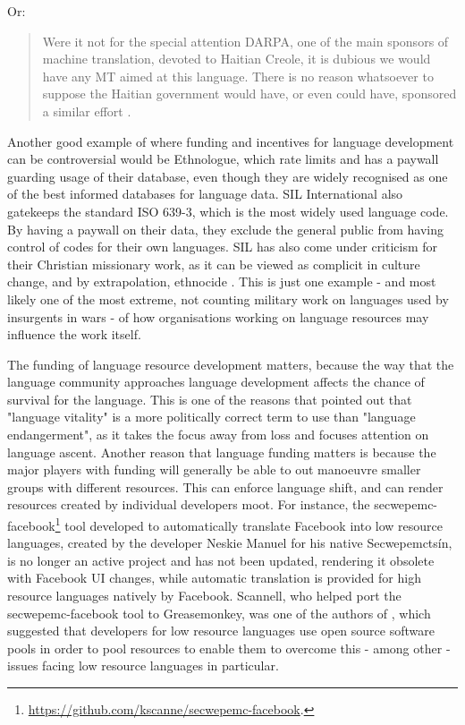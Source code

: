 Or:

\begin{quote}
Were it not for the special attention DARPA, one of the main sponsors of machine translation, devoted to Haitian Creole, it is dubious we would have any MT aimed at this language. There is no reason whatsoever to suppose the Haitian government would have, or even could have, sponsored a similar effort \citep{spice}. \citep[9]{kornai2013digital}
\end{quote}

Another good example of where funding and incentives for language development can be controversial would be Ethnologue, which rate limits and has a paywall guarding usage of their database, even though they are widely recognised as one of the best informed databases for language data. SIL International also gatekeeps the standard ISO 639-3, which is the most widely used language code. By having a paywall on their data, they exclude the general public from having control of codes for their own languages. SIL has also come under criticism for their Christian missionary work, as it can be viewed as complicit in culture change, and by extrapolation, ethnocide \citep{dobrin2009sil, dobrin2009practical, everett2009don}. This is just one example - and most likely one of the most extreme, not counting military work on languages used by insurgents in wars - of how organisations working on language resources may influence the work itself.

The funding of language resource development matters, because the way that the language community approaches language development affects the chance of survival for the language. This is one of the reasons that \citet{grenoble2016response} pointed out that "language vitality" is a more politically correct term to use than "language endangerment", as it takes the focus away from loss and focuses attention on language ascent. Another reason that language funding matters is because the major players with funding will generally be able to out manoeuvre smaller groups with different resources. This can enforce language shift, and can render resources created by individual developers moot. For instance, the secwepemc-facebook\footnote{\href{https://github.com/kscanne/secwepemc-facebook}{https://github.com/kscanne/secwepemc-facebook}. } tool developed to automatically translate Facebook into low resource languages, created by the developer Neskie Manuel for his native Secwepemcts\'in, is no longer an active project and has not been updated, rendering it obsolete with Facebook UI changes, while automatic translation is provided for high resource languages natively by Facebook. Scannell, who helped port the secwepemc-facebook tool to Greasemonkey, was one of the authors of \citet{streiter2006implementing}, which suggested that developers for low resource languages use open source software pools in order to pool resources to enable them to overcome this - among other - issues facing low resource languages in particular.

